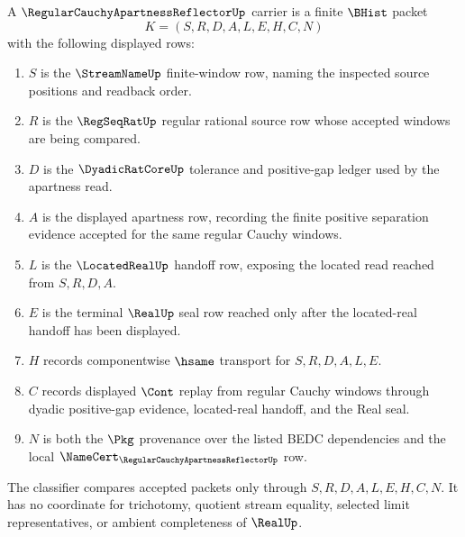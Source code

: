 \begin{definition}
\label{def:regular-cauchy-apartness-reflector-carrier}
A $\RegularCauchyApartnessReflectorUp$ carrier is a finite $\BHist$ packet
$$
K=(S,R,D,A,L,E,H,C,N)
$$
with the following displayed rows:
\begin{enumerate}
\item $S$ is the $\StreamNameUp$ finite-window row, naming the inspected source positions and readback order.
\item $R$ is the $\RegSeqRatUp$ regular rational source row whose accepted windows are being compared.
\item $D$ is the $\DyadicRatCoreUp$ tolerance and positive-gap ledger used by the apartness read.
\item $A$ is the displayed apartness row, recording the finite positive separation evidence accepted for the same regular Cauchy windows.
\item $L$ is the $\LocatedRealUp$ handoff row, exposing the located read reached from $S,R,D,A$.
\item $E$ is the terminal $\RealUp$ seal row reached only after the located-real handoff has been displayed.
\item $H$ records componentwise $\hsame$ transport for $S,R,D,A,L,E$.
\item $C$ records displayed $\Cont$ replay from regular Cauchy windows through dyadic positive-gap evidence, located-real handoff, and the Real seal.
\item $N$ is both the $\Pkg$ provenance over the listed BEDC dependencies and the local $\NameCert_{\RegularCauchyApartnessReflectorUp}$ row.
\end{enumerate}
The classifier compares accepted packets only through $S,R,D,A,L,E,H,C,N$. It has no coordinate for trichotomy, quotient stream equality, selected limit representatives, or ambient completeness of $\RealUp$.
\end{definition}

